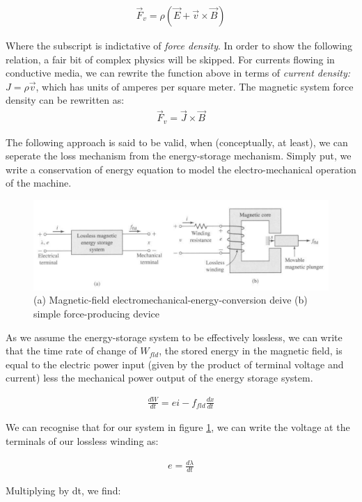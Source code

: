 \documentclass{book}
\begin{document}
\begin{align*}
	\vec{F}_v = \rho (\vec{E} + \vec{v} \times \vec{B})
\end{align*}

Where the subscript is indictative of \textit{force density}. In order to show the following relation, a fair bit of complex physics will be skipped. For currents flowing in conductive media, we can rewrite the function above in terms of \textit{current density:} $J=\rho \vec{v}$, which has units of amperes per square meter. The magnetic system force density can be rewritten as:
\begin{align*}
	\vec{F}_v = \vec{J} \times \vec{B}
\end{align*}

The following approach is said to be valid, when (conceptually, at least), we can seperate the loss mechanism from the energy-storage mechanism. Simply put, we write a conservation of energy equation to model the electro-mechanical operation of the machine. 

\begin{figure}[h]
	\centering
	\includegraphics[width=0.4\linewidth]{Screenshots/electromech_model}
	\caption{(a) Magnetic-field electromechanical-energy-conversion deive (b) simple force-producing device}
	\label{fig:electromechmodel}
\end{figure}

As we assume the energy-storage system to be effectively lossless, we can write that the time rate of change of $W_{fld}$, the stored energy in the magnetic field, is equal to the electric power input (given by the product of terminal voltage and current) less the mechanical power output of the energy storage system.

\begin{align*}
	\frac{dW}{dt} = ei - f_{fld} \frac{dx}{dt}
\end{align*}

We can recognise that for our system in figure \ref{fig:electromechmodel}, we can write the voltage at the terminals of our lossless winding as:

\begin{align*}
	e = \frac{d\lambda}{dt}
\end{align*}

Multiplying by dt, we find:
\end{document}
